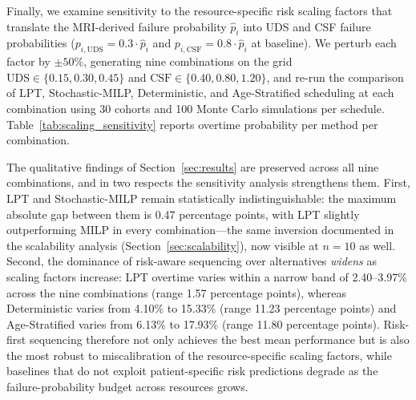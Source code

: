 \documentclass[11pt,a4paper]{article}
\begin{document}

Finally, we examine sensitivity to the resource-specific risk scaling factors that translate the MRI-derived failure probability $\hat{p}_i$ into UDS and CSF failure probabilities ($p_{i,\text{UDS}} = 0.3 \cdot \hat{p}_i$ and $p_{i,\text{CSF}} = 0.8 \cdot \hat{p}_i$ at baseline). We perturb each factor by $\pm 50\%$, generating nine combinations on the grid $\text{UDS} \in \{0.15, 0.30, 0.45\}$ and $\text{CSF} \in \{0.40, 0.80, 1.20\}$, and re-run the comparison of LPT, Stochastic-MILP, Deterministic, and Age-Stratified scheduling at each combination using 30 cohorts and 100 Monte Carlo simulations per schedule. Table~\ref{tab:scaling_sensitivity} reports overtime probability per method per combination.

The qualitative findings of Section~\ref{sec:results} are preserved across all nine combinations, and in two respects the sensitivity analysis strengthens them. First, LPT and Stochastic-MILP remain statistically indistinguishable: the maximum absolute gap between them is 0.47 percentage points, with LPT slightly outperforming MILP in every combination---the same inversion documented in the scalability analysis (Section~\ref{sec:scalability}), now visible at $n=10$ as well. Second, the dominance of risk-aware sequencing over alternatives \emph{widens} as scaling factors increase: LPT overtime varies within a narrow band of 2.40--3.97\% across the nine combinations (range 1.57 percentage points), whereas Deterministic varies from 4.10\% to 15.33\% (range 11.23 percentage points) and Age-Stratified varies from 6.13\% to 17.93\% (range 11.80 percentage points). Risk-first sequencing therefore not only achieves the best mean performance but is also the most robust to miscalibration of the resource-specific scaling factors, while baselines that do not exploit patient-specific risk predictions degrade as the failure-probability budget across resources grows.
\end{document}
